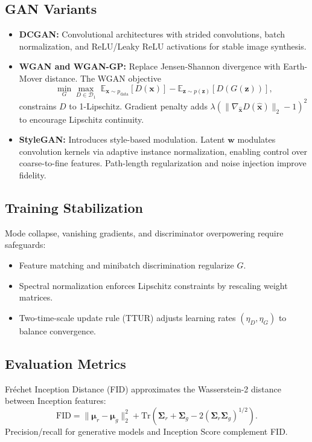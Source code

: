 \documentclass{article}
\begin{document}
\subsection{GAN Variants}
\begin{itemize}
  \item \textbf{DCGAN:} Convolutional architectures with strided convolutions, batch normalization, and ReLU/Leaky ReLU activations for stable image synthesis.
  \item \textbf{WGAN and WGAN-GP:} Replace Jensen-Shannon divergence with Earth-Mover distance. The WGAN objective
  \begin{equation}
    \min_{G} \max_{D \in \mathcal{D}_1} \; \mathbb{E}_{\mathbf{x} \sim p_{\mathrm{data}}} [D(\mathbf{x})] - \mathbb{E}_{\mathbf{z} \sim p(\mathbf{z})} [D(G(\mathbf{z}))],
  \end{equation}
  constrains $D$ to 1-Lipschitz. Gradient penalty adds $\lambda (\|\nabla_{\hat{\mathbf{x}}} D(\hat{\mathbf{x}})\|_2 - 1)^2$ to encourage Lipschitz continuity.
  \item \textbf{StyleGAN:} Introduces style-based modulation. Latent $\mathbf{w}$ modulates convolution kernels via adaptive instance normalization, enabling control over coarse-to-fine features. Path-length regularization and noise injection improve fidelity.
\end{itemize}

\subsection{Training Stabilization}
Mode collapse, vanishing gradients, and discriminator overpowering require safeguards:
\begin{itemize}
  \item Feature matching and minibatch discrimination regularize $G$.
  \item Spectral normalization enforces Lipschitz constraints by rescaling weight matrices.
  \item Two-time-scale update rule (TTUR) adjusts learning rates $(\eta_D, \eta_G)$ to balance convergence.
\end{itemize}

\subsection{Evaluation Metrics}
Fréchet Inception Distance (FID) approximates the Wasserstein-2 distance between Inception features:
\begin{equation}
  \mathrm{FID} = \|\boldsymbol{\mu}_r - \boldsymbol{\mu}_g\|_2^2 + \mathrm{Tr}\left(\boldsymbol{\Sigma}_r + \boldsymbol{\Sigma}_g - 2(\boldsymbol{\Sigma}_r \boldsymbol{\Sigma}_g)^{1/2}\right).
\end{equation}
Precision/recall for generative models and Inception Score complement FID.
\end{document}
